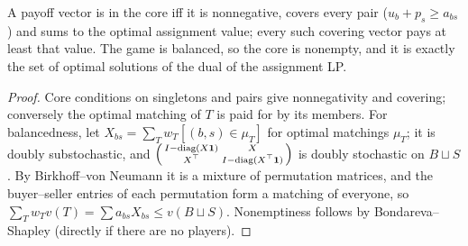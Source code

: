\begin{theorem}
\label{thm:assignment-core}
\leanok
{}
A payoff vector is in the core iff it is nonnegative, covers every pair ($u_b + p_s \ge a_{bs}$) and sums to the optimal
assignment value; every such covering vector pays at least that value. The game is balanced, so the core is
nonempty, and it is exactly the set of optimal solutions of the dual of the assignment LP.
\end{theorem}
\begin{proof}
\leanok
Core conditions on singletons and pairs give nonnegativity and covering; conversely the optimal matching of $T$
is paid for by its members. For balancedness, let $X_{bs} = \sum_T w_T [(b,s) \in \mu_T]$ for optimal matchings $\mu_T$;
it is doubly substochastic, and $\begin{psmallmatrix} I - \mathrm{diag}(X\mathbf 1) & X \\ X^\top & I - \mathrm{diag}(X^\top \mathbf 1)\end{psmallmatrix}$
is doubly stochastic on $B \sqcup S$. By Birkhoff--von Neumann it is a mixture of permutation matrices, and the
buyer--seller entries of each permutation form a matching of everyone, so $\sum_T w_T v(T) = \sum a_{bs} X_{bs} \le v(B \sqcup S)$.
Nonemptiness follows by Bondareva--Shapley (directly if there are no players).
\end{proof}

